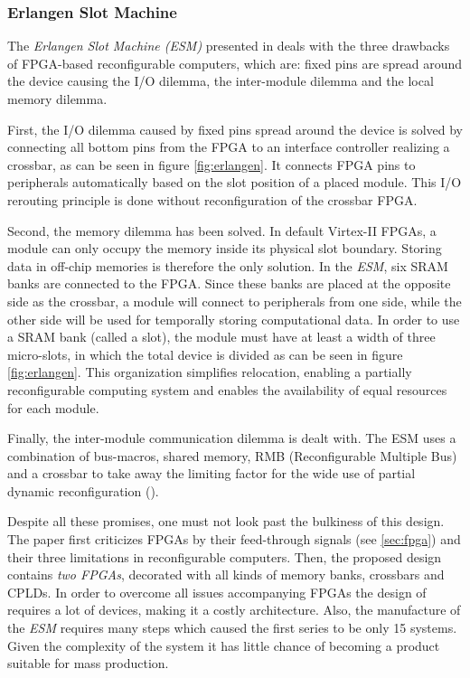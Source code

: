 \subsubsection{Erlangen Slot Machine}
The \emph{Erlangen Slot Machine (ESM)} presented in \cite{erlangen} deals with the three drawbacks of FPGA-based reconfigurable computers, which are: fixed pins are spread around the device causing the I/O dilemma, the inter-module dilemma and the local memory dilemma. 

First, the I/O dilemma caused by fixed pins spread around the device is solved by connecting all bottom pins from the FPGA to an interface controller realizing a crossbar, as can be seen in figure \ref{fig:erlangen}. It connects FPGA pins to peripherals automatically based on the slot position of a placed module. This I/O rerouting principle is done without reconfiguration of the crossbar FPGA.

Second, the memory dilemma has been solved. In default Virtex-II FPGAs, a module can only occupy the memory inside its physical slot boundary. Storing data in off-chip memories is therefore the only solution. In the \emph{ESM}, six SRAM banks are connected to the FPGA. Since these banks are placed at the opposite side as the crossbar, a module will connect to peripherals from one side, while the other side will be used for temporally storing computational data. In order to use a SRAM bank (called a slot), the module must have at least a width of three micro-slots, in which the total device is divided as can be seen in figure \ref{fig:erlangen}. This organization simplifies relocation, enabling a partially reconfigurable computing system and enables the availability of equal resources for each module.

Finally, the inter-module communication dilemma is dealt with. The ESM uses a combination of bus-macros, shared memory, RMB (Reconfigurable Multiple Bus) and a crossbar to take away the limiting factor for the wide use of partial dynamic reconfiguration (\cite{erlangen}).

Despite all these promises, one must not look past the bulkiness of this design. The paper first criticizes FPGAs by their feed-through signals (see \ref{sec:fpga}) and their three limitations in reconfigurable computers. Then, the proposed design contains \emph{two FPGAs}, decorated with all kinds of memory banks, crossbars and CPLDs. In order to overcome all issues accompanying FPGAs the design of \cite{erlangen} requires a lot of devices, making it a costly architecture. Also, the manufacture of the \emph{ESM} requires many steps which caused the first series to be only 15 systems. Given the complexity of the system it has little chance of becoming a product suitable for mass production.


